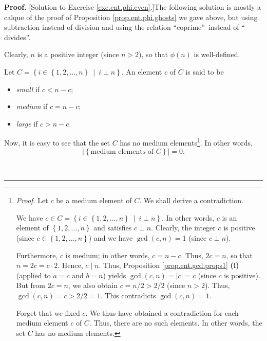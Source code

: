 \documentclass[numbers=enddot,12pt,final,onecolumn,notitlepage]{scrartcl}%
\numberwithin{exer}{subsection}
\theoremstyle{definition}
\newenvironment{fineprint}{\begin{small}}{\end{small}}
\newenvironment{proof}[1][Proof]{\noindent\textbf{#1.} }{\ \rule{0.5em}{0.5em}}
\begin{document}
\begin{fineprint}
\begin{proof}
[Solution to Exercise \ref{exe.ent.phi.even}.]The following solution is mostly
a calque of the proof of Proposition \ref{prop.ent.phi.ghosts} we gave above,
but using subtraction instead of division and using the relation
\textquotedblleft coprime\textquotedblright\ instead of \textquotedblleft
divides\textquotedblright.

Clearly, $n$ is a positive integer (since $n>2$), so that $\phi\left(
n\right)  $ is well-defined.

Let $C=\left\{  i\in\left\{  1,2,\ldots,n\right\}  \ \mid\ i\perp n\right\}
$. An element $c$ of $C$ is said to be

\begin{itemize}
\item \textit{small} if $c<n-c$;

\item \textit{medium} if $c=n-c$;

\item \textit{large} if $c>n-c$.
\end{itemize}

Now, it is easy to see that the set $C$ has no medium
elements\footnote{\textit{Proof.} Let $c$ be a medium element of $C$. We shall
derive a contradiction.
\par
We have $c\in C=\left\{  i\in\left\{  1,2,\ldots,n\right\}  \ \mid\ i\perp
n\right\}  $. In other words, $c$ is an element of $\left\{  1,2,\ldots
,n\right\}  $ and satisfies $c\perp n$. Clearly, the integer $c$ is positive
(since $c\in\left\{  1,2,\ldots,n\right\}  $) and we have $\gcd\left(
c,n\right)  =1$ (since $c\perp n$).
\par
Furthermore, $c$ is medium; in other words, $c=n-c$. Thus, $2c=n$, so that
$n=2c=c\cdot2$. Hence, $c\mid n$. Thus, Proposition \ref{prop.ent.gcd.props1}
\textbf{(i)} (applied to $a=c$ and $b=n$) yields $\gcd\left(  c,n\right)
=\left\vert c\right\vert =c$ (since $c$ is positive). But from $2c=n$, we also
obtain $c=n/2>2/2$ (since $n>2$). Thus, $\gcd\left(  c,n\right)  =c>2/2=1$.
This contradicts $\gcd\left(  c,n\right)  =1$.
\par
Forget that we fixed $c$. We thus have obtained a contradiction for each
medium element $c$ of $C$. Thus, there are no such elements. In other words,
the set $C$ has no medium elements.}. In other words,%
\[
\left\vert \left\{  \text{medium elements of }C\right\}  \right\vert =0.
\]



\end{proof}
\end{fineprint}
\end{document}
